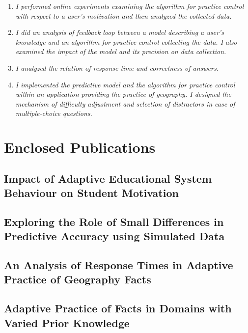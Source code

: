 \documentclass[table,color,cover,twoside,nolot,nolof]{fithesis3/fithesis3}
\begin{document}
\begin{enumerate}
	\item {}

		\textit{I performed online experiments examining the algorithm for practice
			control with respect to a user's motivation and then analyzed the collected
			data.}
	\item {}

		\textit{I did an analysis of feedback loop between a model describing
			a user's knowledge and an algorithm for practice control collecting the
			data. I also examined the impact of the model and its precision on data
			collection.}
	\item {}

		\textit{I analyzed the relation of response time and correctness of answers.}

	\item {}

		\textit{I implemented the predictive model and the algorithm for practice
			control within an application providing the practice of geography. I designed
			the mechanism of difficulty adjustment and selection of distractors in case of
			multiple-choice questions.}
\end{enumerate}




\appendix
\chapter{Enclosed Publications}
\section{Impact of Adaptive Educational System Behaviour on Student Motivation}

\section{Exploring the Role of Small Differences in Predictive Accuracy using  Simulated Data}

\section{An Analysis of Response Times in Adaptive Practice of Geography Facts}

\section{Adaptive Practice of Facts in Domains with Varied Prior Knowledge}

\end{document}
